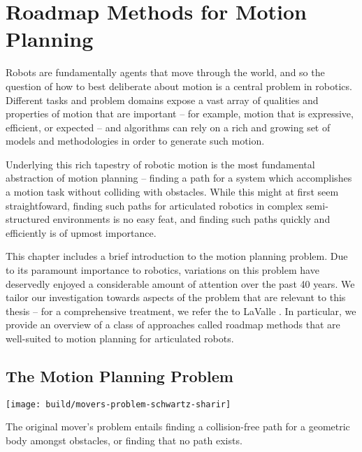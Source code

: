 \chapter{Roadmap Methods for Motion Planning}
\label{chap:roadmaps}

Robots are fundamentally agents that move through the world,
and so the question of how to best deliberate about motion
is a central problem in robotics.
Different tasks and problem domains expose a vast array of
qualities and properties of motion that are important
-- for example, motion that is expressive, efficient, or expected
-- and algorithms can rely on a rich and growing set
of models and methodologies in order to generate such motion.

Underlying this rich tapestry of robotic motion
is the most fundamental abstraction of motion planning --
finding a path for a system which accomplishes a motion task
without colliding with obstacles.
While this might at first seem straightfoward,
finding such paths for articulated robotics in
complex semi-structured environments
is no easy feat,
and finding such paths quickly and efficiently
is of upmost importance.

This chapter includes a brief introduction to
the motion planning problem.
Due to its paramount importance to robotics,
variations on this problem have deservedly
enjoyed a considerable amount of attention over the past 40 years.
We tailor our investigation towards aspects of the problem
that are relevant to this thesis
-- for a comprehensive treatment,
we refer the to LaValle \citep{lavalle2006planningbook}.
In particular,
we provide an overview of a class of approaches called roadmap methods
that are well-suited to motion planning for articulated robots.

\section{The Motion Planning Problem}

\begin{marginfigure}
   \centering
   \texttt{[image: build/movers-problem-schwartz-sharir]} %
   \caption{The original mover's problem
      \citep{schwartzsharir1983pianomovers1}
      entails finding a collision-free path for a geometric body
      amongst obstacles,
      or finding that no path exists.}
   \label{fig:roadmaps:movers}
\end{marginfigure}

